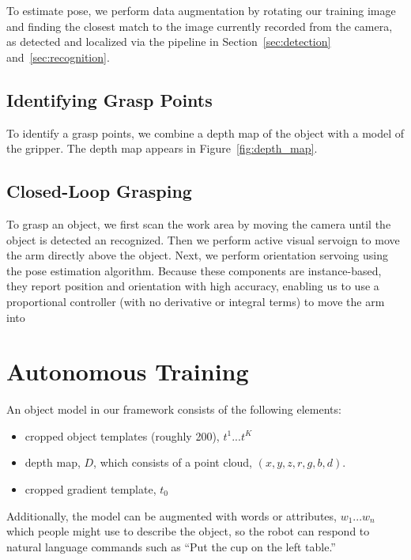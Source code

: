 \documentclass[conference]{IEEEtran}
\begin{document}
To estimate pose, we perform data augmentation by rotating our
training image and finding the closest match to the image currently
recorded from the camera, as detected and localized via the pipeline
in Section~\ref{sec:detection} and~\ref{sec:recognition}.

\subsection{Identifying Grasp Points}

To identify a grasp points, we combine a depth map of the object with
a model of the gripper.  The depth map appears in
Figure~\ref{fig:depth_map}.

\subsection{Closed-Loop Grasping}

To grasp an object, we first scan the work area by moving the camera
until the object is detected an recognized.  Then we perform active
visual servoign to move the arm directly above the object.  Next, we
perform orientation servoing using the pose estimation
algorithm. Because these components are instance-based, they report
position and orientation with high accuracy, enabling us to use a
proportional controller (with no derivative or integral terms) to move
the arm into





\section{Autonomous Training}
\label{sec:training}

An object model in our framework consists of the following elements:
\begin{itemize}
\item cropped object templates (roughly 200), $t^1 ... t^K$
\item depth map, $D$, which consists of a point cloud, $(x, y, z, r, g, b, d)$.
\item cropped gradient template, $t_0$
\end{itemize}

Additionally, the model can be augmented with words or attributes,
$w_1... w_n$ which people might use to describe the object, so the
robot can respond to natural language commands such as ``Put the cup
on the left table.''
\end{document}
